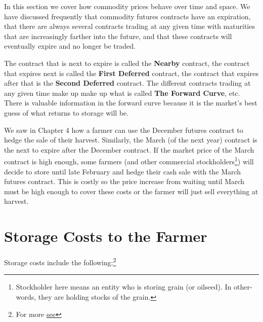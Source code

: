 \documentclass[
]{book}
\begin{document}
In this section we cover how commodity prices behave over time and space. We have discussed frequently that commodity futures contracts have an expiration, that there are always several contracts trading at any given time with maturities that are increasingly farther into the future, and that these contracts will eventually expire and no longer be traded.

The contract that is next to expire is called the \textbf{Nearby} contract, the contract that expires next is called the \textbf{First Deferred} contract, the contract that expires after that is the \textbf{Second Deferred} contract. The different contracts trading at any given time make up make up what is called \textbf{The Forward Curve}, etc. There is valuable information in the forward curve because it is the market's best guess of what returns to storage will be.

We saw in Chapter 4 how a farmer can use the December futures contract to hedge the sale of their harvest. Similarly, the March (of the next year) contract is the next to expire after the December contract. If the market price of the March contract is high enough, some farmers (and other commercial stockholders\footnote{Stockholder here means an entity who is storing grain (or oilseed). In other-words, they are holding stocks of the grain.}) will decide to store until late February and hedge their cash sale with the March futures contract. This is costly so the price increase from waiting until March must be high enough to cover these costs or the farmer will just sell everything at harvest.

\hypertarget{storage-costs-to-the-farmer}{%
\section{Storage Costs to the Farmer}\label{storage-costs-to-the-farmer}}

Storage costs include the following:\footnote{For more \href{https://www.extension.iastate.edu/agdm/crops/pdf/a2-33.pdf}{see}}
\end{document}
